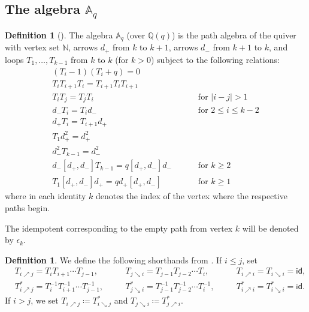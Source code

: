 \documentclass[reqno]{amsart}
\theoremstyle{plain}
\theoremstyle{definition}
\newtheorem{definition}[theorem]{Definition}
\theoremstyle{remark}
\newcommand{\N}{\mathbb{N}}
\newcommand{\Q}{\mathbb{Q}}
\newcommand{\A}{\mathbb{A}}%
\newcommand{\<}{\langle}
\renewcommand{\>}{\rangle}
\begin{document}
\subsection{The algebra \texorpdfstring{$\A_q$}{Aq}}

\begin{definition}[{\cite[Definition~3.1]{CarlssonMellit2018ShuffleConjecture}}]
    \label{def:Aq}
    The algebra $\A_q$ (over $\Q(q)$) is the path algebra of the quiver with vertex set $\N$, arrows $d_+$ from $k$ to $k+1$, arrows $d_-$ from $k+1$ to $k$, and loops $T_1, \dots, T_{k-1}$ from $k$ to $k$ (for $k > 0$) subject to the following relations:
    \begin{align}
        (T_i-1)(T_i+q) = 0 & \label{eq:skein} \tag{S} \\
        T_i T_{i+1} T_i = T_{i+1} T_i T_{i+1} & \label{eq:braid} \tag{B} \\
        T_i T_j = T_j T_i & \qquad \text{ for } \lvert i-j \rvert > 1 \label{eq:commuting} \tag{C} \\
        d_- T_i = T_i d_- & \qquad \text{ for } 2 \leq i \leq k-2 \label{eq:r1} \tag{R1} \\
        d_+ T_i = T_{i+1} d_+ & \label{eq:r2} \tag{R2} \\
        T_1 d_+^2 = d_+^2 & \label{eq:r3} \tag{R3} \\
        d_-^2T_{k-1} = d_-^2 & \label{eq:r4} \tag{R4} \\
        d_- [d_+,d_-] T_{k-1} = q [d_+,d_-] d_- & \qquad \text{ for } k \geq 2 \label{eq:r5} \tag{R5} \\
        T_1 [d_+,d_-] d_+ = q d_+ [d_+,d_-] & \qquad \text{ for } k \geq 1 \label{eq:r6} \tag{R6}
    \end{align}
    where in each identity $k$ denotes the index of the vertex where the respective paths begin.
    
    The idempotent corresponding to the empty path from vertex $k$ will be denoted by $\epsilon_k$.
\end{definition}

\begin{definition}
    We define the following shorthands from \cite{CarlssonMellit2018ShuffleConjecture}. If $i \leq j$, set
    \begin{align*}
        & T_{i \nearrow j} = T_i T_{i+1} \cdots T_{j-1}, && \quad T_{j \searrow i} = T_{j-1} T_{j-2} \cdots T_{i}, && \quad T_{i  \nearrow i} = T_{i \searrow i} = \mathsf{id}, \\
        & T_{i \nearrow j}^* = T_i^{-1} T_{i+1}^{-1} \cdots T_{j-1}^{-1}, && \quad T_{j \searrow i}^* = T_{j-1}^{-1} T_{j-2}^{-1} \cdots T_{i}^{-1}, && \quad T_{i \nearrow i}^* = T_{i \searrow i}^* = \mathsf{id}.
    \end{align*}
    If $i > j$, we set $T_{i \nearrow j} \coloneqq T_{i \searrow j}^*$ and $T_{j \searrow i} \coloneqq T_{j \nearrow i}^*$.
\end{definition}
\end{document}
